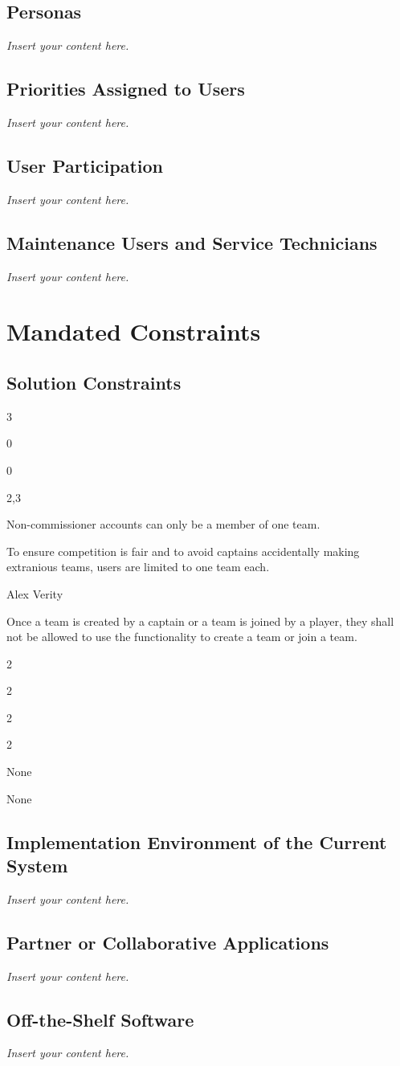 \documentclass[12pt]{article}
\newenvironment{myreq}[1]{%
\setlist[description]{font=\normalfont\color{darkgray}}%
\begin{tcolorbox}[colframe=black,colback=white, sharp corners, boxrule=1pt]%
\bfseries\color{blue}%
\begin{description}#1}%
{\end{description}\end{tcolorbox}}
\newcommand{\threeinline}[3]{\begin{multicols}{3}#1 #2 #3\end{multicols}}
\newcommand{\twoinline}[2]{\begin{multicols}{2}#1 #2\end{multicols}}
\newcommand{\reqno}{\item[Requirement \#:]}
\newcommand{\reqtype}{\item[Requirement Type:]}
\newcommand{\reqevent}{\item[Event/BUC/PUC \#:]}
\newcommand{\reqdesc}{\item[Description:]}
\newcommand{\reqrat}{\item[Rationale:]}
\newcommand{\reqorig}{\item[Originator:]}
\newcommand{\reqfit}{\item[Fit Criterion:]}
\newcommand{\reqsatis}{\item[Customer Satisfaction:]}
\newcommand{\reqdissat}{\item[Customer Dissatisfaction:]}
\newcommand{\reqdep}{\item[Dependencies:]}
\newcommand{\reqconf}{\item[Conflicts:]}
\newcommand{\reqmater}{\item[Materials:]}
\newcommand{\reqhist}{\item[History:]}
\newcommand{\lips}{\textit{Insert your content here.}}
\begin{document}
\subsection{Personas}
\lips
\subsection{Priorities Assigned to Users}
\lips
\subsection{User Participation}
\lips
\subsection{Maintenance Users and Service Technicians}
\lips

\section{Mandated Constraints}
\subsection{Solution Constraints}

\begin{myreq}
  \threeinline
    {\reqno 0}
    {\reqtype 0}
    {\reqevent 2,3}
  \reqdesc Non-commissioner accounts can only be a member of one team.
  \reqrat To ensure competition is fair and to avoid captains accidentally
  making extranious teams, users are limited to one team each.
  \reqorig Alex Verity
  \reqfit Once a team is created by a captain or a team is joined by a player,
  they shall not be allowed to use the functionality to create a team or join
  a team.
  \twoinline
    {\reqsatis 2}
    {\reqdissat 2}
  \twoinline
  {\reqdep None}
  {\reqconf None}
  \reqmater
  \reqhist
\end{myreq}

\subsection{Implementation Environment of the Current System}
\lips
\subsection{Partner or Collaborative Applications}
\lips
\subsection{Off-the-Shelf Software}
\lips
\end{document}
